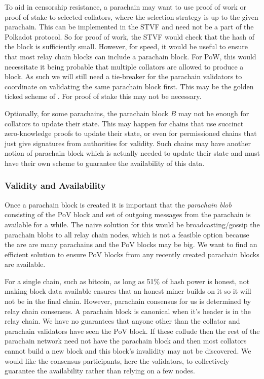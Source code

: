 To aid in censorship resistance, a parachain may want to use proof of work or proof of stake to selected collators, where the selection strategy is up to the given parachain.
This can be implemented in the STVF and need not be a part of the Polkadot protocol. So for proof of work,
the STVF would check that the hash of the block is sufficiently small.
However, for speed, it would be useful to ensure that most relay chain blocks can include a parachain block.
For PoW, this would necessitate it being probable that multiple collators are allowed to produce a block.
As such we will still need a tie-breaker for the parachain validators to coordinate on validating the same parachain block first.
This may be the golden ticked scheme of \cite{2016:Wood:Polkadot}. For proof of stake this may not be necessary.

Optionally, for some parachains, the parachain block $B$ may not be enough for collators to update their state. This may happen for chains that use succinct zero-knowledge proofs to update their state, or even for permissioned chains that just give signatures from authorities for validity. Such chains may have another notion of parachain block which is actually needed to update their state and must have their own scheme to guarantee the availability of this data.





\subsubsection{Validity and Availability} \label{sec:validity-and-availability}
Once a parachain block is created it is important that the {\em parachain blob} consisting of the PoV block and set of outgoing messages from the parachain is available for a while.
The naive solution for this would be broadcasting/gossip the parachain blobs to all relay chain nodes, which is not a feasible option because the are are many parachains and the PoV blocks may be big.
We want to find an efficient solution to ensure PoV blocks from any recently created parachain blocks are available.

For a single chain, such as bitcoin, as long as 51\% of hash power is honest, not making block data available ensures that an honest miner builds on it so it will not be in the final chain. However, parachain consensus for us is determined by relay chain consensus.
A parachain block is canonical when it's header is in the relay chain.
We have no guarantees that anyone other than the collator and parachain validators have seen the PoV block.
If these collude then the rest of the parachain network need not have the parachain block and then most collators cannot build a new block and this block's invalidity may not be discovered.
We would like the consensus participants, here the validators, to collectively guarantee the availability rather than relying on a few nodes.

